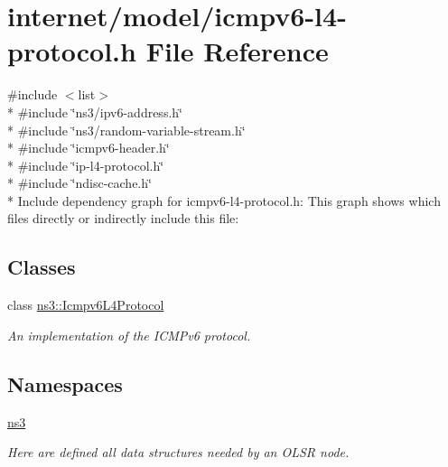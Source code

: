 \hypertarget{icmpv6-l4-protocol_8h}{}\section{internet/model/icmpv6-\/l4-\/protocol.h File Reference}
\label{icmpv6-l4-protocol_8h}
{\ttfamily \#include $<$list$>$}\\*
{\ttfamily \#include \char`\"{}ns3/ipv6-\/address.\+h\char`\"{}}\\*
{\ttfamily \#include \char`\"{}ns3/random-\/variable-\/stream.\+h\char`\"{}}\\*
{\ttfamily \#include \char`\"{}icmpv6-\/header.\+h\char`\"{}}\\*
{\ttfamily \#include \char`\"{}ip-\/l4-\/protocol.\+h\char`\"{}}\\*
{\ttfamily \#include \char`\"{}ndisc-\/cache.\+h\char`\"{}}\\*
Include dependency graph for icmpv6-\/l4-\/protocol.h\+:
This graph shows which files directly or indirectly include this file\+:
\subsection*{Classes}
\begin{DoxyCompactItemize}
\item 
class \hyperlink{classns3_1_1Icmpv6L4Protocol}{ns3\+::\+Icmpv6\+L4\+Protocol}
\begin{DoxyCompactList}\small\item\em An implementation of the I\+C\+M\+Pv6 protocol. \end{DoxyCompactList}\end{DoxyCompactItemize}
\subsection*{Namespaces}
\begin{DoxyCompactItemize}
\item 
 \hyperlink{namespacens3}{ns3}
\begin{DoxyCompactList}\small\item\em Here are defined all data structures needed by an O\+L\+SR node. \end{DoxyCompactList}\end{DoxyCompactItemize}

